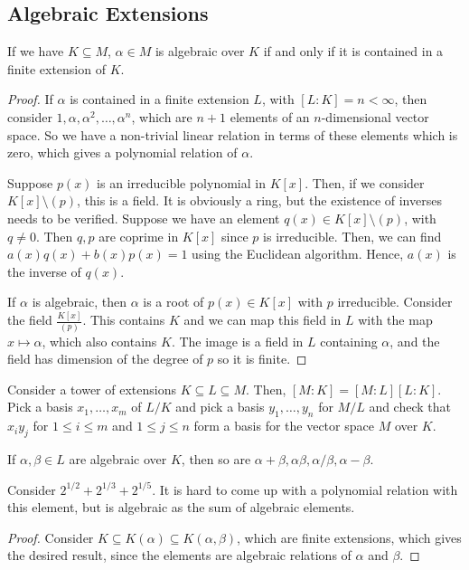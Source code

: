 \documentclass[11pt]{scrartcl}
\begin{document}
\subsection{Algebraic Extensions}
\begin{thm} If we have $K \subseteq M$, $\alpha \in M$ is algebraic over $K$ if and only if it is contained in a finite extension of $K$.
\end{thm}
\begin{proof}
If $\alpha$ is contained in a finite extension $L$, with $[L : K] = n < \infty$, then consider $1, \alpha, \alpha^2 , \dots, \alpha^n$, which are $n+1$ elements of an $n$-dimensional vector space.  So we have a non-trivial linear relation in terms of these elements which is zero, which gives a polynomial relation of $\alpha$.

Suppose $p(x)$ is an irreducible polynomial in $K[x]$.  Then, if we consider $K[x]\setminus (p)$, this is a field.  It is obviously a ring, but the existence of inverses needs to be verified.  Suppose we have an element $q(x) \in K[x]\setminus (p)$, with $q \ne 0$.  Then $q, p$ are coprime in $K[x]$ since $p$ is irreducible.  Then, we can find $a(x)q(x) + b(x)p(x) = 1$ using the Euclidean algorithm.  Hence, $a(x)$ is the inverse of $q(x)$.

If $\alpha$ is algebraic, then $\alpha$ is a root of $p(x) \in K[x]$ with $p$ irreducible.  Consider the field $\frac{K[x]}{(p)}$.  This contains $K$ and we can map this field in $L$ with the map $x \mapsto \alpha$, which also contains $K$.  The image is a field in $L$ containing $\alpha$, and the field has dimension of the degree of $p$ so it is finite.
\end{proof}

Consider a tower of extensions $K \subseteq L \subseteq M$.  Then, $[M:K] = [M:L][L:K]$.  Pick a basis $x_1, \dots, x_m$ of $L/K$ and pick a basis $y_1, \dots, y_n$ for $M/L$ and check that $x_iy_j$ for $1 \le i \le m$ and $1 \le j \le n$ form a basis for the vector space $M$ over $K$.

\begin{thm} If $\alpha, \beta \in L$ are algebraic over $K$, then so are $\alpha + \beta, \alpha \beta, \alpha/\beta, \alpha-  \beta$.
\end{thm}
\begin{example} Consider $2^{1/2} + 2^{1/3} + 2^{1/5}$.  It is hard to come up with a polynomial relation with this element, but is algebraic as the sum of algebraic elements.
\end{example}
\begin{proof}
Consider $K \subseteq K(\alpha) \subseteq K(\alpha, \beta)$, which are finite extensions, which gives the desired result, since the elements are algebraic relations of $\alpha$ and $\beta$.
\end{proof}
\end{document}
